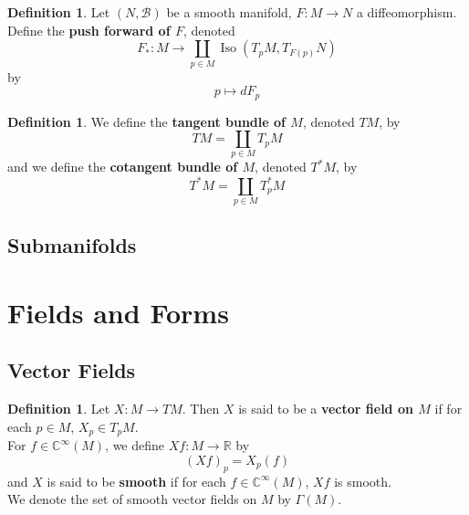 \documentclass[12pt]{amsart}
\theoremstyle{definition}
\newtheorem{defn}[definition]{Definition}
\theoremstyle{remark}
\theoremstyle{definition}
\newcommand{\Gam}{\Gamma}
\newcommand{\C}{\mathbb{C}}
\newcommand{\R}{\mathbb{R}}
\newcommand{\MB}{\mathcal{B}}
\DeclareMathOperator{\iso}{Iso}
\begin{document}
	\begin{defn}
		Let $(N, \MB)$ be a smooth manifold, $F: M \rightarrow N$ a diffeomorphism. Define the \textbf{push forward of $F$}, denoted $$F_*:M \rightarrow \coprod_{p \in M} \iso(T_pM, T_{F(p)}N)$$ by $$p \mapsto dF_p$$
	\end{defn}
	
		\begin{defn}
		We define the \textbf{tangent bundle of $M$}, denoted $TM$, by $$TM = \coprod_{p \in M} T_pM$$ 
		and we define the \textbf{cotangent bundle of $M$}, denoted $T^*M$, by 
		$$T^*M = \coprod_{p \in M} T_p^*M$$
	\end{defn}
	
	
	\newpage	
	
	
	
	
	
	
	
	
	
	
	
	
	
	
	
	
	
	
	
	
	\subsection{Submanifolds}
	
	\newpage
	
	
	
	
	
	
	
	
	
	
	
	
	
	
	
	
	\section{Fields and Forms}
	\subsection{Vector Fields}
	
	\begin{defn}
		Let $X: M \rightarrow TM$. Then $X$ is said to be a \textbf{vector field on $M$} if for each $p \in M$, $X_p \in T_p M$. \\
		For $f \in \C^{\infty}(M)$, we define $Xf : M \rightarrow \R$ by $$(Xf)_p = X_p(f)$$ 
		and $X$ is said to be \textbf{smooth} if for each $f \in \C^{\infty}(M)$, $Xf$ is smooth.\\
		We denote the set of smooth vector fields on $M$ by $\Gam(M)$.
	\end{defn}
\end{document}
